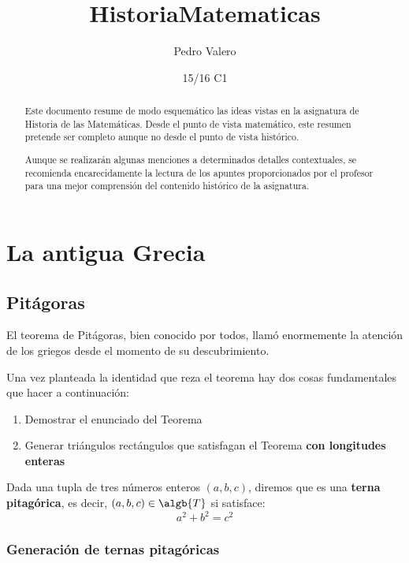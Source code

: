 \documentclass{apuntes}
\title{HistoriaMatematicas}
\author{Pedro Valero}
\date{15/16 C1}
\begin{document}
\setcounter{tocdepth}{3}

\pagestyle{plain}
\maketitle

\begin{abstract}
Este documento resume de modo esquemático las ideas vistas en la asignatura de Historia de las Matemáticas. Desde el punto de vista matemático, este resumen pretende ser completo aunque no desde el punto de vista histórico.

Aunque se realizarán algunas menciones a determinados detalles contextuales, se recomienda encarecidamente la lectura de los apuntes proporcionados por el profesor para una mejor comprensión del contenido histórico de la asignatura.
\end{abstract}

\tableofcontents
\newpage

\chapter{La antigua Grecia}

\section{Pitágoras}
El teorema de Pitágoras, bien conocido por todos, llamó enormemente la atención de los griegos desde el momento de su descubrimiento.

Una vez planteada la identidad que reza el teorema hay dos cosas fundamentales que hacer a continuación:
\begin{enumerate}
\item Demostrar el enunciado del Teorema
\item Generar triángulos rectángulos que satisfagan el Teorema \textbf{con longitudes enteras}
\end{enumerate}


\begin{defn}
Dada una tupla de tres números enteros $(a,b,c)$, diremos que es una \textbf{terna pitagórica}, es decir, $(a,b,c) \in \algb{T}$ si satisface:
\[a^2+b^2=c^2\]
\end{defn}

\subsection{Generación de ternas pitagóricas}
\end{document}
